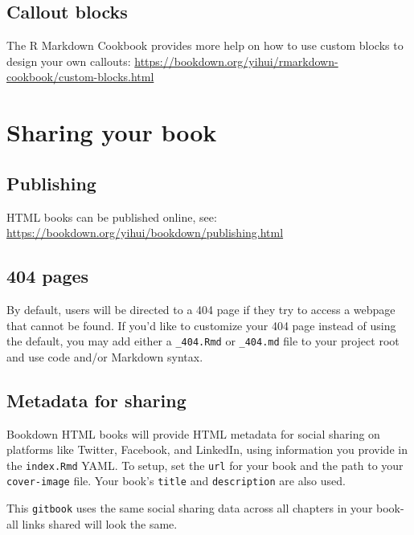 \documentclass[
]{book}
\theoremstyle{definition}
\theoremstyle{definition}
\theoremstyle{definition}
\theoremstyle{definition}
\theoremstyle{remark}
\begin{document}
\hypertarget{callout-blocks}{%
\section{Callout blocks}\label{callout-blocks}}

The R Markdown Cookbook provides more help on how to use custom blocks to design your own callouts: \url{https://bookdown.org/yihui/rmarkdown-cookbook/custom-blocks.html}

\hypertarget{sharing-your-book}{%
\chapter{Sharing your book}\label{sharing-your-book}}

\hypertarget{publishing}{%
\section{Publishing}\label{publishing}}

HTML books can be published online, see: \url{https://bookdown.org/yihui/bookdown/publishing.html}

\hypertarget{pages}{%
\section{404 pages}\label{pages}}

By default, users will be directed to a 404 page if they try to access a webpage that cannot be found. If you'd like to customize your 404 page instead of using the default, you may add either a \texttt{\_404.Rmd} or \texttt{\_404.md} file to your project root and use code and/or Markdown syntax.

\hypertarget{metadata-for-sharing}{%
\section{Metadata for sharing}\label{metadata-for-sharing}}

Bookdown HTML books will provide HTML metadata for social sharing on platforms like Twitter, Facebook, and LinkedIn, using information you provide in the \texttt{index.Rmd} YAML. To setup, set the \texttt{url} for your book and the path to your \texttt{cover-image} file. Your book's \texttt{title} and \texttt{description} are also used.

This \texttt{gitbook} uses the same social sharing data across all chapters in your book- all links shared will look the same.
\end{document}

